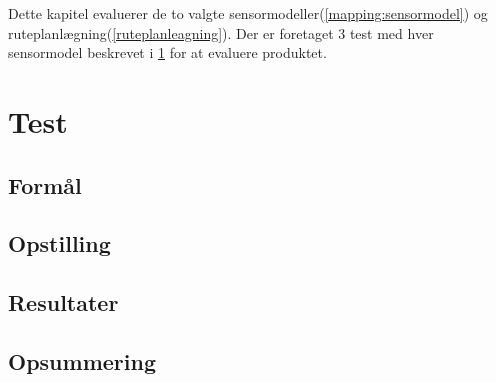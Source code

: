 Dette kapitel evaluerer de to valgte sensormodeller(\cref{mapping:sensormodel}) og ruteplanlægning(\cref{ruteplanleagning}).
Der er foretaget 3 test med hver sensormodel beskrevet i \cref{evaluering:test_beskrivelse} for at evaluere produktet.

\section{Test}\label{evaluering:test_beskrivelse}

\subsection{Formål}

\subsection{Opstilling}

\subsection{Resultater}

\subsection{Opsummering}